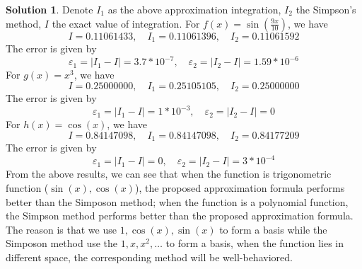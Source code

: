 \documentclass{article}
\theoremstyle{definition}
\newtheorem{solution}{Solution}
\begin{document}
\begin{solution}
	Denote $I_1$ as the above approximation integration, $I_2$ the Simpson's method, $I$ the exact value of integration. For $f(x)=\sin(\frac{9x}{10})$, we have
	\begin{equation}
		I=0.11061433,\quad I_1=0.11061396,\quad I_2=0.11061592
	\end{equation}
	The error is given by
	\begin{equation}
		\varepsilon_1 = |I_1-I|=3.7*10^{-7}, \quad \varepsilon_2 = |I_2-I|=1.59*10^{-6}
	\end{equation}
	For $g(x)=x^3$, we have
	\begin{equation}
		I=0.25000000,\quad I_1=0.25105105,\quad I_2=0.25000000
	\end{equation}
	The error is given by
	\begin{equation}
		\varepsilon_1 = |I_1-I|=1*10^{-3}, \quad \varepsilon_2 = |I_2-I|=0
	\end{equation}
	For $h(x)=\cos(x)$, we have
	\begin{equation}
		I=0.84147098, \quad I_1=0.84147098, \quad I_2=0.84177209
	\end{equation}
	The error is given by
	\begin{equation}
		\varepsilon_1 = |I_1-I|=0, \quad \varepsilon_2 = |I_2-I|=3*10^{-4}
	\end{equation}
	From the above results, we can see that when the function is trigonometric function ($\sin(x),\cos(x)$), the proposed approximation formula performs better than the Simposon method; when the function is a polynomial function, the Simpson method performs better than the proposed approximation formula. The reason is that we use $1,\cos(x),\sin(x)$ to form a basis while the Simposon method use the $1,x,x^2,\dots$ to form a basis, when the function lies in different space, the corresponding method will be well-behaviored.
\end{solution}
\end{document}
